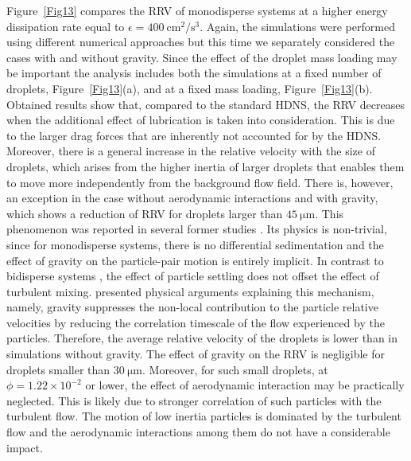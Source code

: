 \documentclass[../thesis.tex]{subfiles}
\begin{document}
Figure~\ref{Fig13} compares the RRV of monodisperse systems at a higher energy dissipation rate equal to $\epsilon = 400~\mathrm{cm^2/s^3}$. Again, the simulations were performed using different numerical approaches but this time we separately considered the cases with and without gravity. Since the effect of the droplet mass loading may be important the analysis includes both the simulations at a fixed number of droplets, Figure~\ref{Fig13}(a), and at a fixed mass loading, Figure~\ref{Fig13}(b). Obtained results show that, compared to the standard HDNS, the RRV decreases when the additional effect of lubrication is taken into consideration. This is due to the larger drag forces that are inherently not accounted for by the HDNS. Moreover, there is a general increase in the relative velocity with the size of droplets, which arises from the higher inertia of larger droplets that enables them to move more independently from the background flow field. There is, however, an exception in the case without aerodynamic interactions and with gravity, which shows a reduction of RRV for droplets larger than $45~\mathrm{\mu m}$. This phenomenon was reported in several former studies \citep[see][]{RPAGW13, RPAW15, IBC16}. Its physics is non-trivial, since for monodisperse systems, there is no differential sedimentation and the effect of gravity on the particle-pair motion is entirely implicit. In contrast to bidisperse systems \citep{DB18}, the effect of particle settling does not offset the effect of turbulent mixing. \cite{IBC16} presented physical arguments explaining this mechanism, namely, gravity suppresses the non-local contribution to the particle relative velocities by reducing the correlation timescale of the flow experienced by the particles. Therefore, the average relative velocity of the droplets is lower than in simulations without gravity. The effect of gravity on the RRV is negligible for droplets smaller than $30~\mathrm{\mu m}$. Moreover, for such small droplets, at $\phi = 1.22\times10^{-2}$ or lower, the effect of aerodynamic interaction may be practically neglected. This is likely due to stronger correlation of such particles with the turbulent flow. The motion of low inertia particles is dominated by the turbulent flow and the aerodynamic interactions among them do not have a considerable impact.
\end{document}
